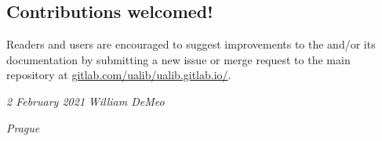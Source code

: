 \subsection*{Contributions welcomed!}
Readers and users are encouraged to suggest improvements to the \agdaualib and/or its documentation by submitting a new issue or merge request to the main repository at \href{https://gitlab.com/ualib/ualib.gitlab.io/}{gitlab.com/ualib/ualib.gitlab.io/}.

\bigskip

\bigskip

\noindent \textit{2 February 2021} \hfill \textit{William DeMeo}

\hfill \textit{Prague}


